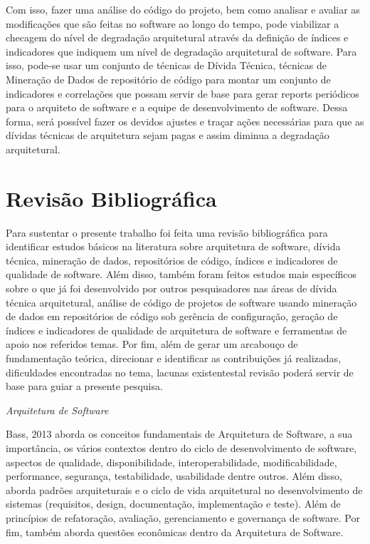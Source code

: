 \documentclass[
	12pt,				%
	openright,			%
	twoside,			%
	a4paper,			%
	english,			%
	french,				%
	spanish,			%
	brazil,				%
	]{abntex2}
\begin{document}
Com isso, fazer uma análise do código do projeto, bem como analisar
e avaliar as modificações que são feitas no software ao longo do tempo,
pode viabilizar a checagem do nível de degradação arquitetural através
da definição de índices e indicadores que indiquem um nível de degradação
arquitetural de software. Para isso, pode-se usar um conjunto de técnicas
de Dívida Técnica, técnicas de Mineração de Dados de repositório de
código para montar um conjunto de indicadores e correlações que possam
servir de base para gerar reports periódicos para o arquiteto de software
e a equipe de desenvolvimento de software. Dessa forma, será possível
fazer os devidos ajustes e traçar ações necessárias para que as dívidas
técnicas de arquitetura sejam pagas e assim diminua a degradação arquitetural. 

\chapter{Revisão Bibliográfica}


Para sustentar o presente trabalho foi feita uma revisão bibliográfica
para identificar estudos básicos na literatura sobre arquitetura de
software, dívida técnica, mineração de dados, repositórios de código,
índices e indicadores de qualidade de software. Além disso, também
foram feitos estudos mais específicos sobre o que já foi desenvolvido
por outros pesquisadores nas áreas de dívida técnica arquitetural,
análise de código de projetos de software usando mineração de dados
em repositórios de código sob gerência de configuração, geração de
índices e indicadores de qualidade de arquitetura de software e ferramentas
de apoio nos referidos temas. Por fim, além de gerar um arcabouço
de fundamentação teórica, direcionar e identificar as contribuições
já realizadas, dificuldades encontradas no tema, lacunas existentestal
revisão poderá servir de base para guiar a presente pesquisa. 

\emph{Arquitetura de Software }

Bass, 2013 aborda os conceitos fundamentais de Arquitetura de Software,
a sua importância, os vários contextos dentro do ciclo de desenvolvimento
de software, aspectos de qualidade, disponibilidade, interoperabilidade,
modificabilidade, performance, segurança, testabilidade, usabilidade
dentre outros. Além disso, aborda padrões arquiteturais e o ciclo
de vida arquitetural no desenvolvimento de sistemas (requisitos, design,
documentação, implementação e teste). Além de princípios de refatoração,
avaliação, gerenciamento e governança de software. Por fim, também
aborda questões econômicas dentro da Arquitetura de Software. 
\end{document}
